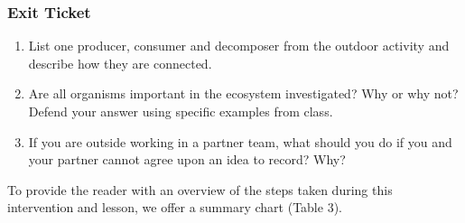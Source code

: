 \documentclass[11pt]{sig-alternate}
\begin{document}
\begin{large}
 \subsubsection*{Exit Ticket}
 \begin{enumerate}
    \item List one producer, consumer and decomposer from the outdoor activity and describe how they are connected.
    \item Are all organisms important in the ecosystem investigated? Why or why not? Defend your answer using specific examples from class.
    \item If you are outside working in a partner team, what should you do if you and your partner cannot agree upon an idea to record? Why?
 \end{enumerate}

To provide the reader with an overview of the steps taken during this intervention and lesson, we offer a summary chart (Table 3). 


\end{large}
\end{document}
